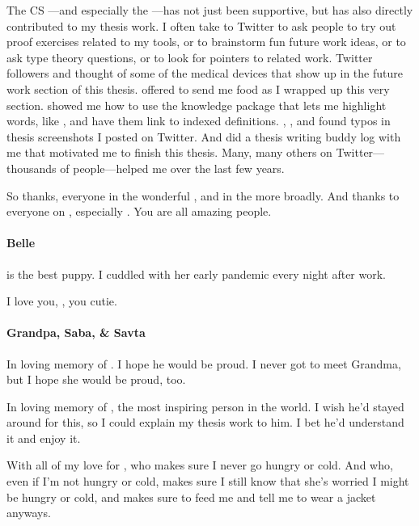 The CS ---and especially the ---has not just been supportive,
but has also directly contributed to my thesis work.
I often take to Twitter to ask people to try out proof exercises related to my tools,
or to brainstorm fun future work ideas,
or to ask type theory questions,
or to look for pointers to related work.
Twitter followers  and  thought of some of the medical devices
that show up in the future work section of this thesis.
 offered to send me food as I wrapped up this very section.
 showed me how to use the knowledge package that lets
me highlight words, like , and have them link to indexed definitions.
, , and  found typos in thesis screenshots I posted on Twitter.
And  did a thesis writing buddy log with me that motivated me to finish this thesis.
Many, many others on Twitter---thousands of people---helped me over the last few years.

So thanks, everyone in the wonderful , and in the  more broadly.
And thanks to everyone on , especially .
You are all amazing people.

\paragraph{Belle}

 is the best puppy. I cuddled with her early pandemic every night after work.

I love you, , you cutie.

\paragraph{Grandpa, Saba, \& Savta}

In loving memory of . I hope he would be proud.
I never got to meet Grandma, but I hope she would be proud, too.

In loving memory of , the most inspiring person in the world.
I wish he'd stayed around for this, so I could explain my thesis work to him.
I bet he'd understand it and enjoy it.

With all of my love for , who makes sure I never go hungry or cold.
And who, even if I'm not hungry or cold, makes sure I still know that she's worried I might be hungry or cold,
and makes sure to feed me and tell me to wear a jacket anyways.

